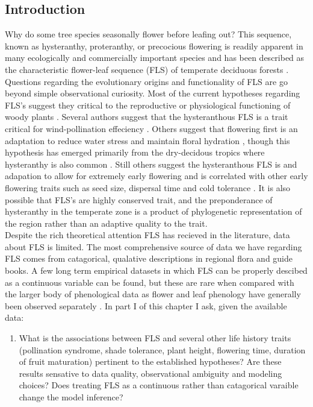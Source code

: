\documentclass{article}\usepackage[]{graphicx}\usepackage[]{color}
\begin{document}
{\subsection*{Introduction}
Why do some tree species seasonally flower before leafing out? This sequence, known as hysteranthy, proteranthy, or precocious flowering is readily apparent in many ecologically and commercially important species and has been described as  the characteristic flower-leaf sequence (FLS) of temperate deciduous forests \citep{Rathcke1985}. Questions regarding the evolutionary origins and functionality of FLS are go beyond simple observational curiosity. Most of the current hypotheses regarding FLS's suggest they critical to the reproductive or physiological functioning of woody plants \citep{Gougherty2018}. Several authors suggest that the hysteranthous FLS is a trait critical for wind-pollination effeciency \citep{Whitehead1969,Friedman2009}. Others suggest that flowering first is an adaptation to reduce water stress and maintain floral hydration \citep{Franklin2016}, though this hypothesis has emerged primarily from the dry-decidous tropics where hysteranthy is also common \citep{Janzen1967,Franklin2016}.  Still others suggest the hysteranthous FLS is and adapation to allow for extremely early flowering and is correlated with other early flowering traits such as seed size, dispersal time and cold tolerance \citep{Gougherty2018,Bolmgren2003,Primack1987}. It is also possible that FLS's are highly conserved trait, and the preponderance of hysteranthy in the temperate zone is a product of phylogenetic representation of the region rather than an adaptive quality to the trait.\\
\indent Despite the rich theoretical attention FLS has recieved in the literature, data about FLS is limited. The most comprehensive source of data we have regarding FLS comes from catagorical, qualative descriptions in regional flora and guide books. A few long term empirical datasets in which FLS can be properly descibed as a continuous variable can be found, but these are rare when compared with the larger body of phenological data as flower and leaf phenology have generally been observed separately \citep{Wolkovich2014}. In part I of this chapter I ask, given the available data:
\begin{enumerate}
\item  What is the associations between FLS and several other life history traits (pollination syndrome, shade tolerance, plant height, flowering time, duration of fruit maturation) pertinent to the established hypotheses? Are these results sensative to data quality, observational ambiguity and modeling choices? Does treating FLS as a continuous rather than catagorical varaible change the model inference?

\end{enumerate}}
\end{document}

